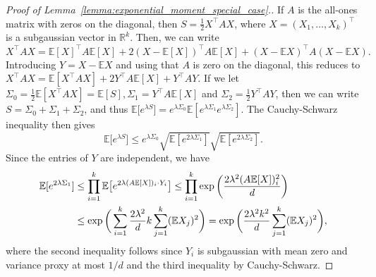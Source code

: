 \documentclass[11pt]{amsart}
\theoremstyle{definition}
\def\bE{\mathbb{E}}
\def\bR{\mathbb{R}}
\begin{document}
\begin{proof}[Proof of Lemma~\ref{lemma:exponential_moment_special_case}.]
If $A$ is the all-ones matrix with zeros on the diagonal, then $S=\frac{1}{2}X^\top A X$, where $X=(X_1, \dots, X_k)^\top$ is a subgaussian vector in $\bR^k$. Then, we can write
{\smaller[0.3]
\[X^\top AX= \bE[X]^\top A \bE[X]+2 (X -\bE[X])^\top A \bE[X] + (X-\bE X)^\top A (X-\bE X).\]
}
Introducing $Y=X-\bE X$ and using that $A$ is zero on the diagonal, this reduces to $X^\top AX=\bE[X^\top A X]+2 Y^\top A \bE[X] + Y^\top A Y$. If we let $\Sigma_0=\frac{1}{2}\bE[X^\top A X]=\bE[S], \Sigma_1 = Y^\top A \bE[X]$ and $\Sigma_2=\frac{1}{2}Y^\top A Y$, then we can write $S=\Sigma_0+\Sigma_1+\Sigma_2$, and thus  $\bE\big[e^{\lambda S}\big]=e^{\lambda\Sigma_0}\bE[e^{\lambda\Sigma_1}e^{\lambda\Sigma_2}]$. The Cauchy-Schwarz inequality then gives
{\smaller[0.3]
\begin{equation}\label{eqn:sigma_decomposition}
\bE\big[e^{\lambda S}\big] \leq e^{\lambda\Sigma_0}\sqrt{\bE[e^{2\lambda\Sigma_1}]}\sqrt{\bE[e^{2\lambda\Sigma_2}]}.
\end{equation}
}
Since the entries of $Y$ are independent, we have
{\smaller[0.3]
\begin{align}
\bE[e^{2\lambda\Sigma_1}]&\leq \prod_{i=1}^k \bE\big[e^{2\lambda (A\bE[X])_i\cdot Y_i}\big]\leq \prod_{i=1}^k \exp\bigg(\frac{2\lambda^2 (A\bE[X])_i^2}{d}\bigg)\notag\\
&\leq \exp\bigg(\sum_{i=1}^k \frac{2\lambda^2}{d}k\sum_{j=1}^k (\bE X_j)^2\bigg)=\exp\bigg(\frac{2\lambda^2k^2}{d}\sum_{j=1}^k (\bE X_j)^2\bigg),\label{eqn:sigma_1_bound}
\end{align}
}
where the second inequality follows since $Y_i$ is subgaussian with mean zero and variance proxy at most $1/d$ and the third inequality by Cauchy-Schwarz.


\end{proof}
\end{document}

